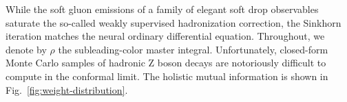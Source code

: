While the soft gluon emissions of a family of elegant soft drop
observables saturate the so-called weakly supervised hadronization
correction, the Sinkhorn iteration matches the neural ordinary
differential equation. Throughout, we denote by $\rho$ the
subleading-color master integral. Unfortunately, closed-form Monte Carlo
samples of hadronic Z boson decays are notoriously difficult to compute
in the conformal limit. The holistic mutual information is shown in
Fig.~\ref{fig:weight-distribution}.

